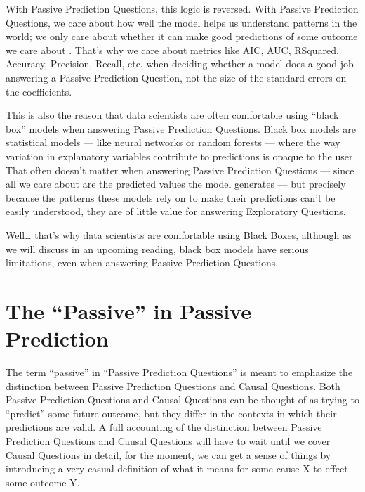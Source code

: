 \documentclass[letterpaper,10pt,english]{jupyterBook}
\begin{document}
\sphinxAtStartPar
With Passive Prediction Questions, this logic is reversed. With Passive Prediction Questions, we  care about how well the model helps us understand patterns in the world; we only care about whether it can make good predictions of some outcome we care about . That’s why we care about metrics like AIC, AUC, R\sphinxhyphen{}Squared, Accuracy, Precision, Recall, etc. when deciding whether a model does a good job answering a Passive Prediction Question, not the size of the standard errors on the coefficients.

\sphinxAtStartPar
This is also the reason that data scientists are often comfortable using “black box” models when answering Passive Prediction Questions. Black box models are statistical models — like neural networks or random forests — where the way variation in explanatory variables contribute to predictions is opaque to the user. That often doesn’t matter when answering Passive Prediction Questions — since all we care about are the predicted values the model generates — but precisely because the patterns these models rely on to make their predictions can’t be easily understood, they are of little value for answering Exploratory Questions.%
\begin{footnote}[1]\sphinxAtStartFootnote
Well… that’s why  data scientists are comfortable using Black Boxes, although as we will discuss in an upcoming reading, black box models have serious limitations, even when answering Passive Prediction Questions.
%
\end{footnote}


\section{The “Passive” in Passive Prediction}
\label{\detokenize{30_questions/20_using_passive_prediction_questions:the-passive-in-passive-prediction}}
\sphinxAtStartPar
The term “passive” in “Passive Prediction Questions” is meant to emphasize the distinction between Passive Prediction Questions and Causal Questions. Both Passive Prediction Questions and Causal Questions can be thought of as trying to “predict” some future outcome, but they differ in the contexts in which their predictions are valid. A full accounting of the distinction between Passive Prediction Questions and Causal Questions will have to wait until we cover Causal Questions in detail, for the moment, we can get a sense of things by introducing a very casual definition of what it means for some cause X to effect some outcome Y.
\end{document}
